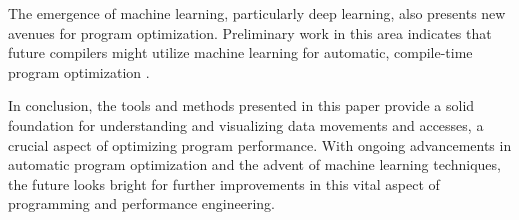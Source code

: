 The emergence of machine learning, particularly deep learning, also presents new avenues for program optimization. Preliminary work in this area indicates that future compilers might utilize machine learning for automatic, compile-time program optimization \cite{cummins2021programl}.

In conclusion, the tools and methods presented in this paper provide a solid foundation for understanding and visualizing data movements and accesses, a crucial aspect of optimizing program performance. With ongoing advancements in automatic program optimization and the advent of machine learning techniques, the future looks bright for further improvements in this vital aspect of programming and performance engineering.